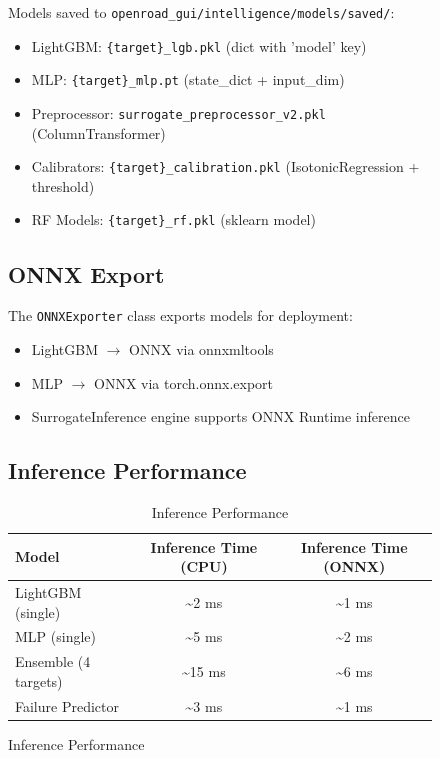 \documentclass[10pt,conference]{IEEEtran}
\begin{document}
\begin{figure}[t]
Models saved to \texttt{openroad\_gui/intelligence/models/saved/}:
\begin{itemize}
    \item LightGBM: \texttt{\{target\}\_lgb.pkl} (dict with 'model' key)
    \item MLP: \texttt{\{target\}\_mlp.pt} (state\_dict + input\_dim)
    \item Preprocessor: \texttt{surrogate\_preprocessor\_v2.pkl} (ColumnTransformer)
    \item Calibrators: \texttt{\{target\}\_calibration.pkl} (IsotonicRegression + threshold)
    \item RF Models: \texttt{\{target\}\_rf.pkl} (sklearn model)
\end{itemize}

\subsection{ONNX Export}

The \texttt{ONNXExporter} class exports models for deployment:
\begin{itemize}
    \item LightGBM $\rightarrow$ ONNX via onnxmltools
    \item MLP $\rightarrow$ ONNX via torch.onnx.export
    \item SurrogateInference engine supports ONNX Runtime inference
\end{itemize}

\subsection{Inference Performance}

\begin{table}[t]
\centering
\caption{Inference Performance}
\label{tab:inference_perf}
\begin{tabular}{@{}lcc@{}}
\toprule
Model & Inference Time (CPU) & Inference Time (ONNX) \\
\midrule
LightGBM (single) & \textasciitilde 2 ms & \textasciitilde 1 ms \\
MLP (single) & \textasciitilde 5 ms & \textasciitilde 2 ms \\
Ensemble (4 targets) & \textasciitilde 15 ms & \textasciitilde 6 ms \\
Failure Predictor & \textasciitilde 3 ms & \textasciitilde 1 ms \\
\bottomrule
\end{tabular}
\end{table}


\end{figure}
\end{document}
